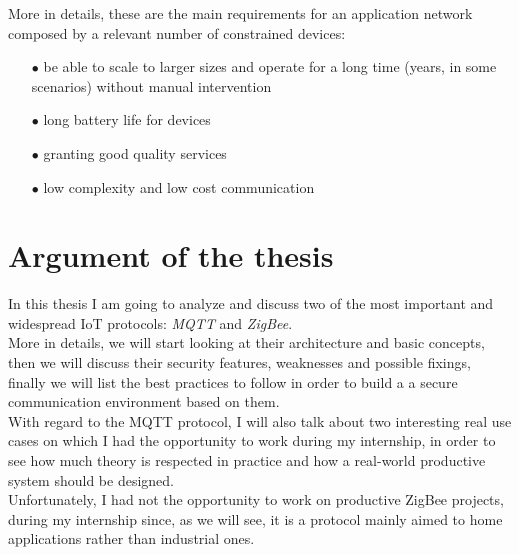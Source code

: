 \documentclass[12pt]{report}
\begin{document}
More in details, these are the main requirements for an application network composed by a relevant number of constrained devices:

\begin{itemize}
\setlength{\itemindent}{+4mm}
\item[$\bullet$] be able to scale to larger sizes and operate for a long time (years, in some scenarios) without manual intervention
\item[$\bullet$] long battery life for devices
\item[$\bullet$] granting good quality services
\item[$\bullet$] low complexity and low cost communication
\end{itemize}

\section{Argument of the thesis}
\bigskip
In this thesis I am going to analyze and discuss two of the most important and widespread IoT protocols: \emph{MQTT} and \emph{ZigBee}.\\
More in details, we will start looking at their architecture and basic concepts, then we will discuss their security features, weaknesses and possible fixings, finally we will list the best practices to follow in order to build a a secure communication environment based on them.\\

With regard to the MQTT protocol, I will also talk about two interesting real use cases on which I had the opportunity to work during my internship, in order to see how much theory is respected in practice and how a real-world productive system should be designed.\\

Unfortunately, I had not the opportunity to work on productive ZigBee projects, during my internship since, as we will see, it is a protocol mainly aimed to home applications rather than industrial ones.\\\newline
\end{document}
